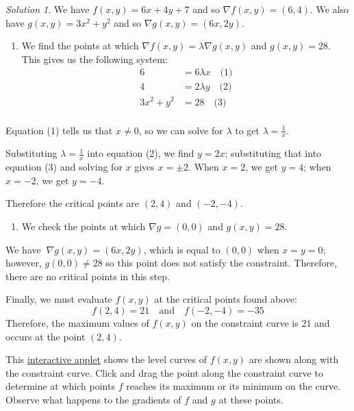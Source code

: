 \documentclass[
]{book}
\providecommand{\tightlist}{%
  \setlength{\itemsep}{0pt}\setlength{\parskip}{0pt}}
\theoremstyle{definition}
\theoremstyle{definition}
\theoremstyle{definition}
\theoremstyle{definition}
\theoremstyle{remark}
\newtheorem*{solution}{Solution}
\begin{document}
\begin{solution}

We have \(f(x,y)=6x+4y+7\) and so \(\nabla f (x,y)= (6, 4)\). We also have \(g(x,y)=3x^2+y^2\) and so \(\nabla g(x,y) = (6x, 2y)\).

\begin{enumerate}
\def\labelenumi{\arabic{enumi}.}
\tightlist
\item
  We find the points at which \(\nabla f(x,y)=\lambda \nabla g(x,y)\) and \(g(x,y)=28\). This gives us the following system:
  \begin{align*}
  6 &=  6 \lambda x \quad \mbox{(1)}\\
  4 &=  2 \lambda y \quad \mbox{(2)}\\
  3x^2+y^2 &=  28 \quad \mbox{(3)}\\
  \end{align*}
\end{enumerate}

Equation (1) tells us that \(x\neq 0\), so we can solve for \(\lambda\) to get \(\lambda=\frac{1}{x}\).

Substituting \(\lambda=\frac{1}{x}\) into equation (2), we find \(y=2x\); substituting that into equation (3) and solving for \(x\) gives \(x=\pm2\). When \(x=2\), we get \(y=4\); when \(x=-2\), we get \(y=-4\).

Therefore the critical points are \((2,4)\) and \((-2,-4)\).

\begin{enumerate}
\def\labelenumi{\arabic{enumi}.}
\setcounter{enumi}{1}
\tightlist
\item
  We check the points at which \(\nabla g = (0,0)\) and \(g(x,y)=28\).
\end{enumerate}

We have \(\ \nabla g(x,y)=(6x, 2y)\), which is equal to \((0,0)\) when \(x=y=0\); however, \(g(0,0)\neq 28\) so this point does not satisfy the constraint. Therefore, there are no critical points in this step.

Finally, we must evaluate \(f(x,y)\) at the critical points found above: \[f(2,4)=21 \quad \mbox{and} \quad f(-2,-4)=-35\]
Therefore, the maximum values of \(f(x,y)\) on the constraint curve is \(21\) and occurs at the point \((2,4)\).

This \href{https://www.geogebra.org/m/ruehzamn}{interactive applet} shows the level curves of \(f(x,y)\) are shown along with the constraint curve. Click and drag the point along the constraint curve to determine at which points \(f\) reaches its maximum or its minimum on the curve. Observe what happens to the gradients of \(f\) and \(g\) at these points.

\end{solution}
\end{document}
